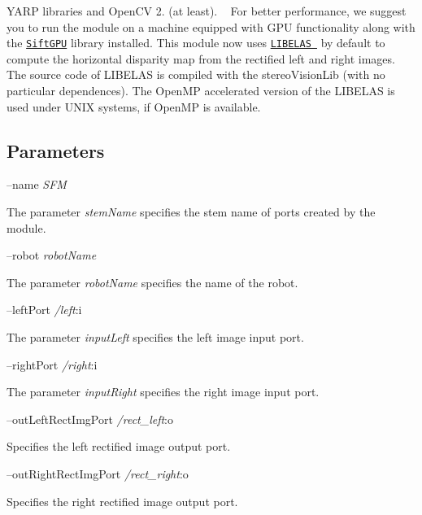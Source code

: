Y\+A\+R\+P libraries and Open\+C\+V 2. (at least). ~\newline
For better performance, we suggest you to run the module on a machine equipped with G\+P\+U functionality along with the \href{http://cs.unc.edu/~ccwu/siftgpu}{\tt Sift\+G\+P\+U} library installed. This module now uses \href{http://www.cvlibs.net/software/libelas/}{\tt L\+I\+B\+E\+L\+A\+S } by default to compute the horizontal disparity map from the rectified left and right images. The source code of L\+I\+B\+E\+L\+A\+S is compiled with the stereo\+Vision\+Lib (with no particular dependences). The Open\+M\+P accelerated version of the L\+I\+B\+E\+L\+A\+S is used under U\+N\+I\+X systems, if Open\+M\+P is available.\hypertarget{group__SFM_parameters_sec}{}\subsection{Parameters}\label{group__SFM_parameters_sec}
--name {\itshape S\+F\+M} 
\begin{DoxyItemize}
\item The parameter {\itshape stem\+Name} specifies the stem name of ports created by the module.
\end{DoxyItemize}

--robot {\itshape robot\+Name} 
\begin{DoxyItemize}
\item The parameter {\itshape robot\+Name} specifies the name of the robot.
\end{DoxyItemize}

--left\+Port {\itshape /left}\+:i
\begin{DoxyItemize}
\item The parameter {\itshape input\+Left} specifies the left image input port.
\end{DoxyItemize}

--right\+Port {\itshape /right}\+:i
\begin{DoxyItemize}
\item The parameter {\itshape input\+Right} specifies the right image input port.
\end{DoxyItemize}

--out\+Left\+Rect\+Img\+Port {\itshape /rect\+\_\+left}\+:o
\begin{DoxyItemize}
\item Specifies the left rectified image output port.
\end{DoxyItemize}

--out\+Right\+Rect\+Img\+Port {\itshape /rect\+\_\+right}\+:o
\begin{DoxyItemize}
\item Specifies the right rectified image output port.
\end{DoxyItemize}

